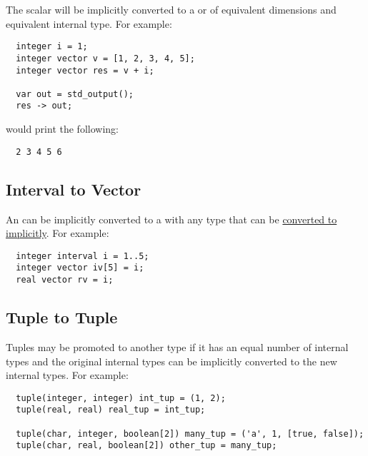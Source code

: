 \documentclass[../gazprea.tex]{subfiles}
\begin{document}
The scalar will be implicitly converted to a  or  of equivalent dimensions
and equivalent internal type. For example:
\begin{lstlisting}
  integer i = 1;
  integer vector v = [1, 2, 3, 4, 5];
  integer vector res = v + i;

  var out = std_output();
  res -> out;
\end{lstlisting}

would print the following:
\begin{lstlisting}
  2 3 4 5 6
\end{lstlisting}

\subsection{Interval to Vector}
\label{ssec:typePromotion_ivltov}
An  can be implicitly converted to a  with any type that 
can be \hyperref[ssec:typePromotion_scalar]{converted to implicitly}. For example:
\begin{lstlisting}
  integer interval i = 1..5;
  integer vector iv[5] = i;
  real vector rv = i;
\end{lstlisting}

\subsection{Tuple to Tuple}
\label{ssec:typePromotion_ttot}
Tuples may be promoted to another type if it has an equal number of internal types and the original
internal types can be implicitly converted to the new internal types. For example:
\begin{lstlisting}
  tuple(integer, integer) int_tup = (1, 2);
  tuple(real, real) real_tup = int_tup;

  tuple(char, integer, boolean[2]) many_tup = ('a', 1, [true, false]);
  tuple(char, real, boolean[2]) other_tup = many_tup; 
\end{lstlisting}
\end{document}
